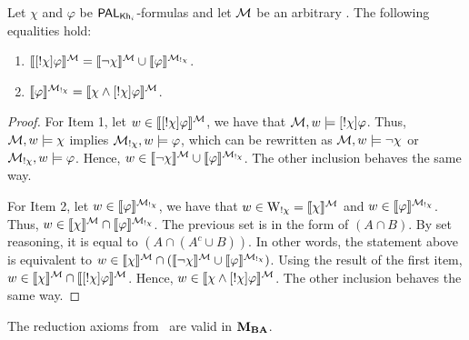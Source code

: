 \medskip 

\begin{lemma}\label{lem:palproperties} Let $\chi$ and $\varphi$ be $\mathsf{PAL}_{{\sf Kh}_i}$-formulas and let $\mathcal{M}$ be an arbitrary \ults.
	The following equalities hold:
	\begin{multicols}{2}
	\begin{enumerate}
	\item $\llbracket [!\chi]\varphi \rrbracket^{\mathcal{M}} = \llbracket \neg\chi \rrbracket^{\mathcal{M}} \cup \llbracket \varphi \rrbracket^{\mathcal{M}_{!\chi}}$.
	\item $\llbracket \varphi \rrbracket^{\mathcal{M}_{!\chi}} = \llbracket \chi \wedge [!\chi]\varphi \rrbracket^{\mathcal{M}}$.
	\end{enumerate}
	\end{multicols}
	\end{lemma}
	
	\begin{proof}
 For Item 1, let $w \in \llbracket [!\chi]\varphi \rrbracket^{\mathcal{M}}$, we have that $\mathcal{M},w \models [!\chi]\varphi$. Thus, $\mathcal{M},w \models \chi$ implies $\mathcal{M}_{!\chi},w \models \varphi$, which can be rewritten as $\mathcal{M},w \models \neg\chi$ or $\mathcal{M}_{!\chi},w \models \varphi$. Hence, $w \in \llbracket \neg\chi \rrbracket^{\mathcal{M}} \cup \llbracket \varphi \rrbracket^{\mathcal{M}_{!\chi}}$. The other inclusion behaves the same way.
 
 
For Item 2, let $w \in \llbracket \varphi \rrbracket^{\mathcal{M}_{!\chi}}$, we have that $w \in \operatorname{W}_{!\chi} = \llbracket \chi \rrbracket^{\mathcal{M}}$ and $w \in \llbracket \varphi \rrbracket^{\mathcal{M}_{!\chi}}$. Thus, $w \in \llbracket \chi \rrbracket^{\mathcal{M}} \cap \llbracket \varphi \rrbracket^{\mathcal{M}_{!\chi}}$. The previous set is in the form of $(A \cap B)$. By set reasoning, it is equal to $(A \cap (A^c \cup B))$.
	In other words, the statement above is equivalent to $w \in \llbracket \chi \rrbracket^{\mathcal{M}} \cap (\llbracket \neg\chi \rrbracket^{\mathcal{M}} \cup \llbracket \varphi \rrbracket^{\mathcal{M}_{!\chi}})$. Using the result of the first item, $w \in \llbracket \chi \rrbracket^{\mathcal{M}} \cap \llbracket [!\chi]\varphi \rrbracket^{\mathcal{M}}$. Hence, $w \in \llbracket \chi \wedge [!\chi]\varphi \rrbracket^{\mathcal{M}}$.
	The other inclusion behaves the same way.
	\end{proof}

\begin{lemma}\label{lemma:palkh-valid}
	The reduction axioms from~ are valid in $\mathbf{M}_{\mathbf{BA}}$.
	\end{lemma}
	
